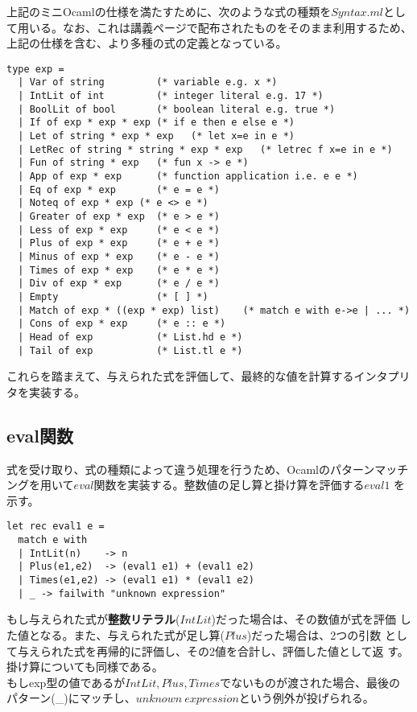 \documentclass[a4paper,9pt]{jsarticle}
\begin{document}
上記のミニOcamlの仕様を満たすために、次のような式の種類を$Syntax.ml$とし
て用いる。なお、これは講義ページで配布されたものをそのまま利用するため、
上記の仕様を含む、より多種の式の定義となっている。

\begin{lstlisting}
type exp = 
  | Var of string         (* variable e.g. x *)
  | IntLit of int         (* integer literal e.g. 17 *)
  | BoolLit of bool       (* boolean literal e.g. true *)
  | If of exp * exp * exp (* if e then e else e *)
  | Let of string * exp * exp   (* let x=e in e *)
  | LetRec of string * string * exp * exp   (* letrec f x=e in e *)
  | Fun of string * exp   (* fun x -> e *)
  | App of exp * exp      (* function application i.e. e e *)
  | Eq of exp * exp       (* e = e *)
  | Noteq of exp * exp (* e <> e *)
  | Greater of exp * exp  (* e > e *)
  | Less of exp * exp     (* e < e *)
  | Plus of exp * exp     (* e + e *)
  | Minus of exp * exp    (* e - e *)
  | Times of exp * exp    (* e * e *)
  | Div of exp * exp      (* e / e *)
  | Empty                 (* [ ] *)
  | Match of exp * ((exp * exp) list)    (* match e with e->e | ... *)
  | Cons of exp * exp     (* e :: e *)
  | Head of exp           (* List.hd e *)
  | Tail of exp           (* List.tl e *)
\end{lstlisting}

これらを踏まえて、与えられた式を評価して、最終的な値を計算するインタプリ
タを実装する。

\subsection{eval関数}

式を受け取り、式の種類によって違う処理を行うため、Ocamlのパターンマッチ
ングを用いて$eval$関数を実装する。整数値の足し算と掛け算を評価する$eval1$
を示す。

\begin{lstlisting}
let rec eval1 e =
  match e with
  | IntLit(n)    -> n
  | Plus(e1,e2)  -> (eval1 e1) + (eval1 e2)
  | Times(e1,e2) -> (eval1 e1) * (eval1 e2)
  | _ -> failwith "unknown expression"
\end{lstlisting}

もし与えられた式が{\bf{整数リテラル}}($IntLit$)だった場合は、その数値が式を評価
した値となる。また、与えられた式が足し算($Plus$)だった場合は、2つの引数
として与えられた式を再帰的に評価し、その2値を合計し、評価した値として返
す。掛け算についても同様である。\\
もしexp型の値であるが$IntLit,Plus,Times$でないものが渡された場合、最後の
パターン(\_)にマッチし、$unknown\ expression$という例外が投げられる。\\
\end{document}

